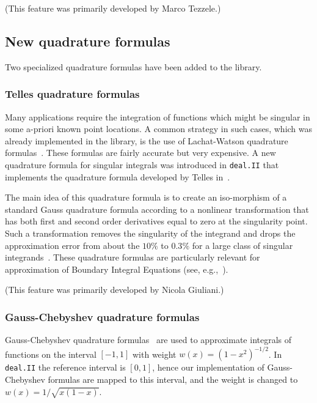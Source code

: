 \documentclass{ansarticle-preprint}
\newcommand{\specialword}[1]{\texttt{#1}}
\newcommand{\dealii}{{\specialword{deal.II}}}
\begin{document}
(This feature was primarily developed by Marco Tezzele.)


\subsection{New quadrature formulas}

Two specialized quadrature formulas have been added to the library.

\subsubsection{Telles quadrature formulas}

Many applications require the integration of functions which might be
singular in some a-priori known point locations. A common strategy in such
cases, which was already implemented in the library, is the use of
Lachat-Watson quadrature formulas~\cite{Lachat1976}. These formulas are
fairly accurate but very expensive. A new quadrature formula for singular
integrals was introduced in \dealii{} that implements the quadrature formula
developed by Telles in~\cite{Telles-2005-a}.

The main idea of this quadrature formula is to create an iso-morphism of a
standard Gauss quadrature formula according to a nonlinear transformation
that has both first and second order derivatives equal to zero at the
singularity point.  Such a transformation removes the singularity of the
integrand and drops the approximation error from about the $10 \%$ to
$0.3\%$ for a large class of singular integrands~\cite{Telles-2005-a}. These
quadrature formulas are particularly relevant for approximation of Boundary
Integral Equations (see, e.g.,~\cite{GiulianiMolaHeltai-2015-a}).

(This feature was primarily developed by Nicola Giuliani.)


\subsubsection{Gauss-Chebyshev quadrature formulas}

Gauss-Chebyshev quadrature formulas~\cite{AbramowitzStegun} are used to
approximate integrals of functions on the interval $[-1,1]$ with weight
$w(x)=(1-x^2)^{-1/2}$.  In \dealii{} the reference interval is $[0,1]$, hence
our implementation of Gauss-Chebyshev formulas are mapped to this interval,
and the weight is changed to $w(x)=1/\sqrt{x(1-x)}$.
\end{document}
